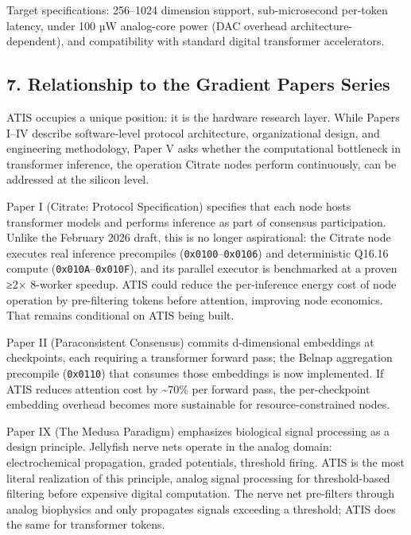 Target specifications: 256--1024 dimension support, sub-microsecond
per-token latency, under 100 µW analog-core power (DAC overhead
architecture-dependent), and compatibility with standard digital
transformer accelerators.

\subsection{7. Relationship to the Gradient Papers
Series}\label{relationship-to-the-gradient-papers-series}

ATIS occupies a unique position: it is the hardware research layer.
While Papers I--IV describe software-level protocol architecture,
organizational design, and engineering methodology, Paper V asks whether
the computational bottleneck in transformer inference, the operation
Citrate nodes perform continuously, can be addressed at the silicon
level.

Paper I (Citrate: Protocol Specification) specifies that each node hosts
transformer models and performs inference as part of consensus
participation. Unlike the February 2026 draft, this is no longer
aspirational: the Citrate node executes real inference precompiles
(\texttt{0x0100}--\texttt{0x0106}) and deterministic Q16.16 compute
(\texttt{0x010A}--\texttt{0x010F}), and its parallel executor is
benchmarked at a proven ≥2× 8-worker speedup. ATIS could reduce the
per-inference energy cost of node operation by pre-filtering tokens
before attention, improving node economics. That remains conditional on
ATIS being built.

Paper II (Paraconsistent Consensus) commits d-dimensional embeddings at
checkpoints, each requiring a transformer forward pass; the Belnap
aggregation precompile (\texttt{0x0110}) that consumes those embeddings
is now implemented. If ATIS reduces attention cost by
\textasciitilde70\% per forward pass, the per-checkpoint embedding
overhead becomes more sustainable for resource-constrained nodes.

Paper IX (The Medusa Paradigm) emphasizes biological signal processing
as a design principle. Jellyfish nerve nets operate in the analog
domain: electrochemical propagation, graded potentials, threshold
firing. ATIS is the most literal realization of this principle, analog
signal processing for threshold-based filtering before expensive digital
computation. The nerve net pre-filters through analog biophysics and
only propagates signals exceeding a threshold; ATIS does the same for
transformer tokens.

